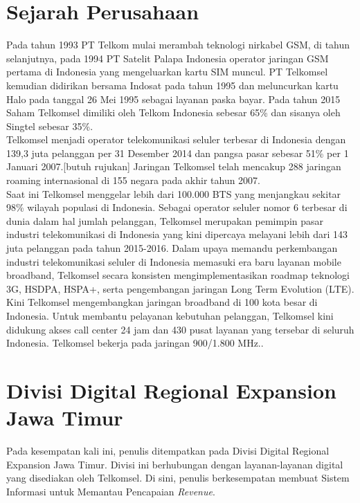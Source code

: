 \section{Sejarah Perusahaan}
\tab Pada tahun 1993 PT Telkom mulai merambah teknologi nirkabel GSM, di tahun selanjutnya, pada 1994 PT Satelit Palapa Indonesia operator jaringan GSM pertama di Indonesia yang mengeluarkan kartu SIM muncul. PT Telkomsel kemudian didirikan bersama Indosat pada tahun 1995 dan meluncurkan kartu Halo pada tanggal 26 Mei 1995 sebagai layanan paska bayar. Pada tahun 2015 Saham Telkomsel dimiliki oleh Telkom Indonesia sebesar 65\% dan sisanya oleh Singtel sebesar 35\%.\\
\tab Telkomsel menjadi operator telekomunikasi seluler terbesar di Indonesia dengan 139,3 juta pelanggan per 31 Desember 2014 dan pangsa pasar sebesar 51\% per 1 Januari 2007.[butuh rujukan] Jaringan Telkomsel telah mencakup 288 jaringan roaming internasional di 155 negara pada akhir tahun 2007. \\
\tab Saat ini Telkomsel menggelar lebih dari 100.000 BTS yang menjangkau sekitar 98\% wilayah populasi di Indonesia. Sebagai operator seluler nomor 6 terbesar di dunia dalam hal jumlah pelanggan, Telkomsel merupakan pemimpin pasar industri telekomunikasi di Indonesia yang kini dipercaya melayani lebih dari 143 juta pelanggan pada tahun 2015-2016. Dalam upaya memandu perkembangan industri telekomunikasi seluler di Indonesia memasuki era baru layanan mobile broadband, Telkomsel secara konsisten mengimplementasikan roadmap teknologi 3G, HSDPA, HSPA+, serta pengembangan jaringan Long Term Evolution (LTE). Kini Telkomsel mengembangkan jaringan broadband di 100 kota besar di Indonesia. Untuk membantu pelayanan kebutuhan pelanggan, Telkomsel kini didukung akses call center 24 jam dan 430 pusat layanan yang tersebar di seluruh Indonesia. Telkomsel bekerja pada jaringan 900/1.800 MHz.\cite{sejarahtsel}.

\section{Divisi Digital Regional Expansion Jawa Timur}
\tab Pada kesempatan kali ini, penulis ditempatkan pada Divisi Digital Regional Expansion Jawa Timur. Divisi ini berhubungan dengan layanan-layanan digital yang disediakan oleh Telkomsel. Di sini, penulis berkesempatan membuat Sistem Informasi untuk Memantau Pencapaian \textit{Revenue}.

\cleardoublepage
